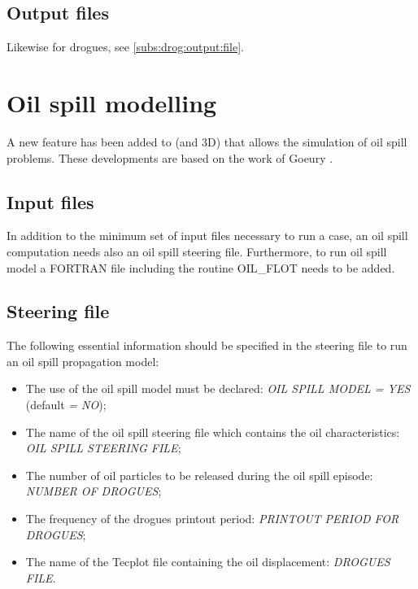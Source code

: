 \subsection{ Output files}

 Likewise for drogues, see \ref{subs:drog:output:file}.


\section{ Oil spill modelling}
\label{sec:oil:spill:modell}
 A new feature has been added to  (and 3D) that allows the simulation of oil spill problems. These developments are based on the work of Goeury \cite{goeury2012}.


\subsection{ Input files}

 In addition to the minimum set of input files necessary to run a  case, an oil spill computation needs also an oil spill steering file. Furthermore, to run oil spill model a FORTRAN file including the routine OIL\_FLOT needs to be added.


\subsection{ Steering file}

 The following essential information should be specified in the \telemac{} steering file to run an oil spill propagation model:

\begin{itemize}
\item  The use of the oil spill model must be declared: \textit{OIL SPILL MODEL = YES} (default\textit{ = NO});

\item  The name of the oil spill steering file which contains the oil characteristics: \textit{OIL SPILL STEERING FILE};

\item  The number of oil particles to be released during the oil spill episode: \textit{NUMBER OF DROGUES};

\item  The frequency of the drogues printout period: \textit{PRINTOUT PERIOD FOR DROGUES}; 

\item  The name of the Tecplot file containing the oil displacement: \textit{DROGUES FILE}.
\end{itemize}

